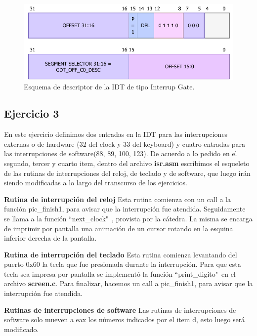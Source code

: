 \documentclass[a4paper]{article}
\begin{document}
\begin{figure}[h]
	\centering
	\includegraphics[scale=0.7]{img/IDTdescriptor.pdf}
	\caption{Esquema de descriptor de la IDT de tipo Interrup Gate.}
\end{figure}


\subsection{Ejercicio 3}
\justify
En este ejercicio definimos dos entradas en la IDT para las interrupciones externas o de hardware (32 del clock y 33 del keyboard) y cuatro entradas para las interrupciones de software(88, 89, 100, 123).
\justify
De acuerdo a lo pedido en el segundo, tercer y cuarto item, dentro del archivo \textbf{isr.asm} escribimos el esqueleto de las rutinas de interrupciones del reloj, de teclado y de software, que luego irán siendo modificadas a lo largo del transcurso de los ejercicios.

\justify
\textbf{Rutina de interrupción del reloj}
\justify
Esta rutina comienza con un call a la función pic_finish1, para avisar que la interrupción fue atendida. Seguidamente se llama a la función ``next_clock"\ , provista por la cátedra. La misma se encarga de imprimir por pantalla una animación de un cursor rotando en la esquina inferior derecha de la pantalla.

\justify
\textbf{Rutina de interrupción del teclado}
\justify
Esta rutina comienza levantando del puerto 0x60 la tecla que fue presionada durante la interrupción. Para que esta tecla sea impresa por pantalla se implementó la función ``print_digito"\ en el archivo \textbf{screen.c}. Para finalizar, hacemos un call a pic_finish1, para avisar que la interrupción fue atendida.

\justify
\textbf{Rutinas de interrupciones de software}
\justify
Las rutinas de interrupciones de software solo mueven a eax los números indicados por el item d, esto luego será modificado.
\end{document}
